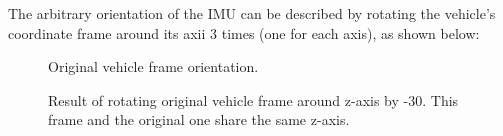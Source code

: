 \documentclass{article}
\begin{document}
	The arbitrary orientation of the IMU can be described by rotating the vehicle's coordinate frame around its axii 3 times (one for each axis), as shown below:
	
	\begin{figure}[!htbp]
		\centering
		\vspace{-0.25cm}
		\vspace{-1cm}
		\caption{Original vehicle frame orientation.}
	\end{figure}
	
	\newpage
	
	\begin{figure}[!htbp]
		\centering
		\vspace{-0.5cm}
		\vspace{-1.25cm}
		\caption{Result of rotating original vehicle frame around z-axis by -30\textdegree. This frame and the original one share the same z-axis.}
	\end{figure}
	
\end{document}
